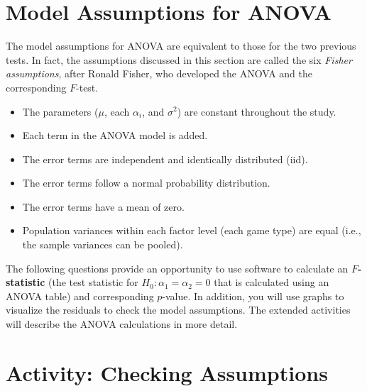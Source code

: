\documentclass[
]{report}
\providecommand{\tightlist}{%
  \setlength{\itemsep}{0pt}\setlength{\parskip}{0pt}}
\begin{document}
\hypertarget{model-assumptions-for-anova}{%
\section*{Model Assumptions for ANOVA}\label{model-assumptions-for-anova}}

The model assumptions for ANOVA are equivalent to those for the two previous tests. In fact, the assumptions discussed in this section are called the six \emph{Fisher assumptions}, after Ronald Fisher, who developed the ANOVA and the corresponding \(F\)-test.

\begin{itemize}
\tightlist
\item
  The parameters (\(\mu\), each \(\alpha_i\), and \(\sigma^2\)) are constant throughout the study.
\item
  Each term in the ANOVA model is added.
\item
  The error terms are independent and identically distributed (iid).
\item
  The error terms follow a normal probability distribution.
\item
  The error terms have a mean of zero.
\item
  Population variances within each factor level (each game type) are equal (i.e., the sample variances can be pooled).
\end{itemize}

The following questions provide an opportunity to use software to calculate an \textbf{\(F\)-statistic} (the test statistic for \(H_0: \alpha_1 = \alpha_2 = 0\) that is calculated using an ANOVA table) and corresponding \(p\)-value. In addition, you will use graphs to visualize the residuals to check the model assumptions. The extended activities will describe the ANOVA calculations in more detail.

\hypertarget{activity-checking-assumptions}{%
\section*{Activity: Checking Assumptions}\label{activity-checking-assumptions}}
\end{document}
